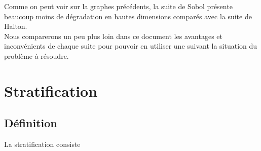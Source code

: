 \documentclass[12pt]{report}
\begin{document}
Comme on peut voir sur la graphes précédents, la suite de Sobol présente beaucoup moins de dégradation en hautes dimensions comparés avec la suite de Halton.\\

Nous comparerons un peu plus loin dans ce document les avantages et inconvénients de chaque suite pour pouvoir en utiliser une suivant la situation du problème à résoudre.
\newpage

\section{Stratification}
\subsection{Définition}

La stratification consiste
\end{document}
